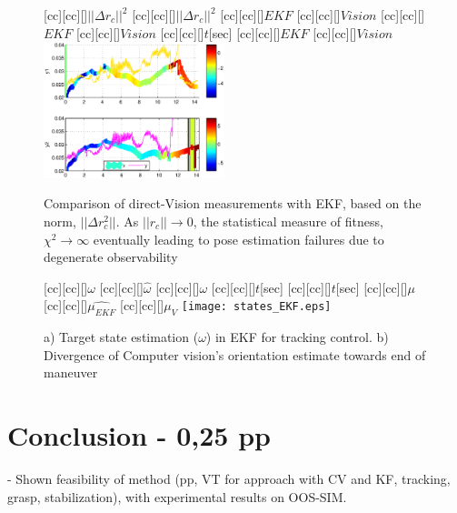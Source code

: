 %
\begin{figure}[t!]
[cc][cc][\FontFigB]{$||\Delta r_c||^2$}
[cc][cc][\FontFigB]{$||\Delta r_c||^2$}
[cc][cc][\FontFigS]{$EKF$}
[cc][cc][\FontFigS]{$Vision$}
[cc][cc][\FontFigS]{$EKF$}
[cc][cc][\FontFigS]{$Vision$}
[cc][cc][\FontFigB]{$t$[sec]}
[cc][cc][\FontFigS]{$EKF$}
[cc][cc][\FontFigS]{$Vision$}
\centering\includegraphics[angle=0,width=0.47\textwidth]{fig_norm_errors.eps}
\caption{Comparison of direct-Vision measurements with EKF, based on the norm, $||\Delta r_c^2||$. As $||r_c|| \rightarrow 0$, the statistical measure of fitness, $\chi^2 \rightarrow \infty $ eventually leading to pose estimation failures due to degenerate observability}
\label{fig:res_1}
\end{figure}
\begin{figure}[t!]
[cc][cc][\FontFigB]{$\omega$}
[cc][cc][\FontFigB]{$\hat{\omega}$}
[cc][cc][\FontFigB]{$\omega$}
[cc][cc][\FontFigB]{$t$[sec]}
[cc][cc][\FontFigB]{$t$[sec]}
[cc][cc][\FontFigB]{$\mu$}
[cc][cc][\FontFigB]{$\hat{\mu_{EKF}}$}
[cc][cc][\FontFigB]{$\mu_V$}
\centering\texttt{[image: states\_EKF.eps]}
\caption{a) Target state estimation ($\omega$) in EKF for tracking control. b) Divergence of Computer vision's orientation estimate towards end of maneuver}
\label{fig:res_1}
\end{figure}
\section{Conclusion - 0,25 pp}

- Shown feasibility of method (pp, VT for approach with CV and KF, tracking, grasp, stabilization), with experimental results on OOS-SIM.

